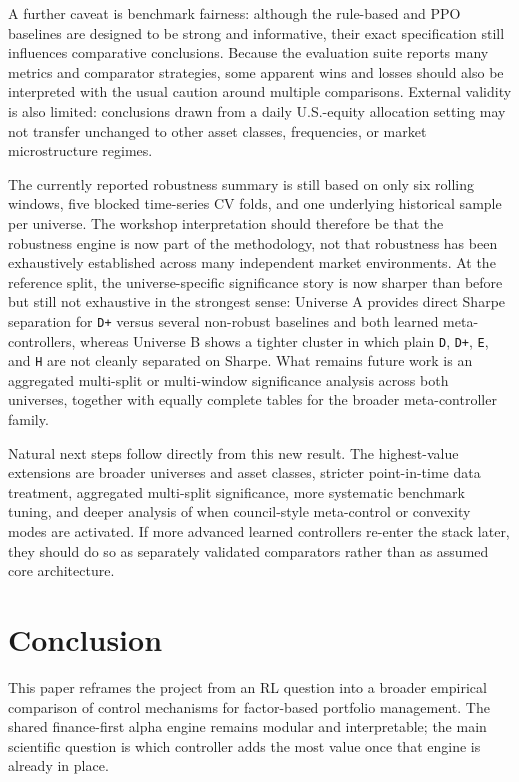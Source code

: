 \documentclass[10pt,twocolumn]{article}
\begin{document}
A further caveat is benchmark fairness: although the rule-based and PPO
baselines are designed to be strong and informative, their exact specification
still influences comparative conclusions. Because the evaluation suite reports
many metrics and comparator strategies, some apparent wins and losses should
also be interpreted with the usual caution around multiple comparisons.
External validity is also limited: conclusions drawn from a daily U.S.-equity
allocation setting may not transfer unchanged to other asset classes,
frequencies, or market microstructure regimes.

The currently reported robustness summary is still based on only six rolling
windows, five blocked time-series CV folds, and one underlying historical
sample per universe. The workshop interpretation should therefore be that the
robustness engine is now part of the methodology, not that robustness has been
exhaustively established across many independent market environments. At the
reference split, the universe-specific significance story is now sharper than
before but still not exhaustive in the strongest sense: Universe A provides
direct Sharpe separation for \texttt{D+} versus several non-robust baselines
and both learned meta-controllers, whereas Universe B shows a tighter cluster
in which plain \texttt{D}, \texttt{D+}, \texttt{E}, and \texttt{H} are not
cleanly separated on Sharpe. What remains future work is an aggregated
multi-split or multi-window significance analysis across both universes,
together with equally complete tables for the broader meta-controller family.

Natural next steps follow directly from this new result. The highest-value
extensions are broader universes and asset classes, stricter point-in-time data
treatment, aggregated multi-split significance, more systematic benchmark
tuning, and deeper analysis of when council-style meta-control or convexity
modes are activated. If more advanced learned
controllers re-enter the stack later, they should do so as separately validated
comparators rather than as assumed core architecture.

\section{Conclusion}

This paper reframes the project from an RL question into a broader empirical
comparison of control mechanisms for factor-based portfolio management. The
shared finance-first alpha engine remains modular and interpretable; the main
scientific question is which controller adds the most value once that engine is
already in place.
\end{document}
